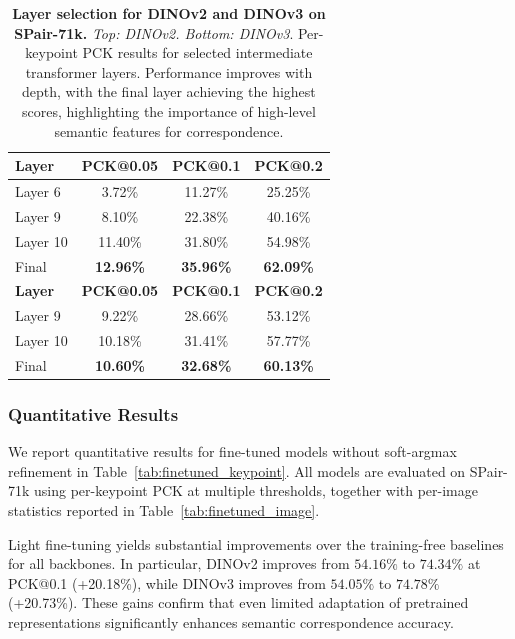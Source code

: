 \begin{table}
    \centering
    \caption{
        \textbf{Layer selection for DINOv2 and DINOv3 on SPair-71k.}
        \textit{Top: DINOv2. Bottom: DINOv3}.
        Per-keypoint PCK results for selected intermediate transformer layers.
        Performance improves with depth, with the final layer achieving the highest scores,
        highlighting the importance of high-level semantic features for correspondence.}
    \label{tab:intermediate_layers}
    \begin{tabular}{lccc}
    \toprule
    \textbf{Layer} & \textbf{PCK@0.05} & \textbf{PCK@0.1} & \textbf{PCK@0.2} \\
    \midrule
    Layer 6  & 3.72\%  & 11.27\% & 25.25\% \\
    Layer 9  & 8.10\%  & 22.38\% & 40.16\% \\
    Layer 10 & 11.40\% & 31.80\% & 54.98\% \\
    Final    & \textbf{12.96\%} & \textbf{35.96\%} & \textbf{62.09\%} \\
    \bottomrule
    \toprule
    \textbf{Layer} & \textbf{PCK@0.05} & \textbf{PCK@0.1} & \textbf{PCK@0.2} \\
    \midrule
    Layer 9  & 9.22\%  & 28.66\% & 53.12\% \\
    Layer 10 & 10.18\% & 31.41\% & 57.77\% \\
    Final    & \textbf{10.60\%} & \textbf{32.68\%} & \textbf{60.13\%} \\
    \bottomrule
    \end{tabular}
\end{table}


\subsubsection{Quantitative Results}

We report quantitative results for fine-tuned models without soft-argmax refinement in Table~\ref{tab:finetuned_keypoint}.
All models are evaluated on SPair-71k using per-keypoint PCK at multiple thresholds, together with per-image statistics reported in Table~\ref{tab:finetuned_image}.

Light fine-tuning yields substantial improvements over the training-free baselines for all backbones.
In particular, DINOv2 improves from $54.16\%$ to $74.34\%$ at PCK@0.1 (+20.18\%), while DINOv3 improves from $54.05\%$ to $74.78\%$ (+20.73\%).
These gains confirm that even limited adaptation of pretrained representations significantly enhances semantic correspondence accuracy.

